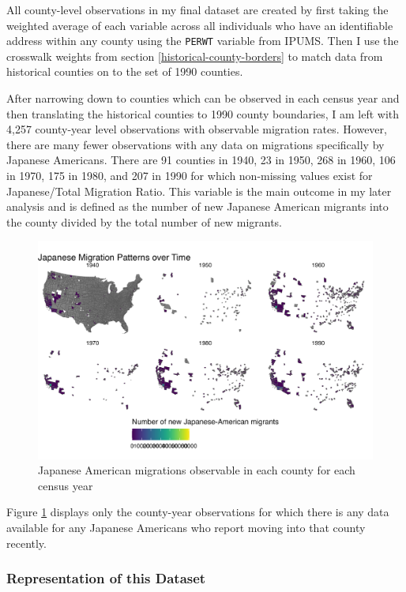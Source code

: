 \documentclass[12pt]{article}
\begin{document}
All county-level observations in my final dataset are created by first taking the weighted average of each variable across all individuals who have an identifiable address within any county 
using the \texttt{PERWT} variable from IPUMS. 
Then I use the crosswalk weights from section \ref{historical-county-borders} to match data from historical counties on to the set of 1990 counties. 

After narrowing down to counties which can be observed in each census
year and then translating the historical counties to 1990 county
boundaries, I am left with 4,257 county-year level observations with observable migration rates.
However, there are many fewer observations with any data on migrations specifically by Japanese Americans.
There are 91 counties in 1940, 23 in 1950, 268 in 1960, 106 in 1970, 175 in 1980, and 207 in 1990 for which non-missing values exist for Japanese/Total Migration Ratio.
This variable is the main outcome in my later analysis and is defined as the number of new Japanese American migrants into the county divided by the total number of new migrants.

\begin{figure}[!h]
    \centering
    \includegraphics[width=1.0\linewidth]{figures/migrationmap.png}
    \caption{Japanese American migrations observable in each county for each census year}
    \label{fig:migrationmap}
\end{figure}

Figure \ref{fig:migrationmap} displays only the county-year observations for which there is any data available for any Japanese Americans who report moving into that county recently. 

\subsubsection{Representation of this Dataset}
\end{document}
